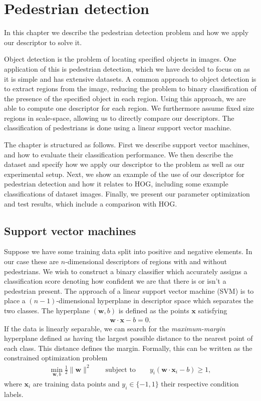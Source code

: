 \documentclass[thesis.tex]{subfiles}
\def\x{\mathbf{x}}
\def\w{\mathbf{w}}
\begin{document}
\chapter{Pedestrian detection}
\label{sec:od}
%
In this chapter we describe the pedestrian detection problem and how we apply our descriptor to solve it.

Object detection is the problem of locating specified objects in images. One application of this is pedestrian detection, which we have decided to focus on as it is simple and has extensive datasets. A common approach to object detection is to extract regions from the image, reducing the problem to binary classification of the presence of the specified object in each region. Using this approach, we are able to compute one descriptor for each region. We furthermore assume fixed size regions in scale-space, allowing us to directly compare our descriptors. The classification of pedestrians is done using a linear support vector machine.

The chapter is structured as follows. First we describe support vector machines, and how to evaluate their classification performance. We then describe the dataset and specify how we apply our descriptor to the problem as well as our experimental setup. Next, we show an example of the use of our descriptor for pedestrian detection and how it relates to HOG, including some example classifications of dataset images. Finally, we present our parameter optimization and test results, which include a comparison with HOG.
%
\section{Support vector machines}
%
Suppose we have some training data split into positive and negative elements. In our case these are $n$-dimensional descriptors of regions with and without pedestrians. We wish to construct a binary classifier which accurately assigns a classification score denoting how confident we are that there is or isn't a pedestrian present. The approach of a linear support vector machine (SVM) is to place a $(n-1)$-dimensional hyperplane in descriptor space which separates the two classes. The hyperplane $(\w,b)$ is defined as the points $\x$ satisfying
%
\begin{align*}
\w \cdot \x - b = 0.
\end{align*}
%
If the data is linearly separable, we can search for the \emph{maximum-margin} hyperplane defined as having the largest possible distance to the nearest point of each class. This distance defines the margin. Formally, this can be written as the constrained optimization problem
%
\begin{align*}
\min_{\w,b} \frac12 \| \w \|^2 \qquad \text{subject to} \qquad y_i (\w \cdot \x_i - b) \geq 1,
\end{align*}
%
where $\x_i$ are training data points and $y_i \in \{-1,1\}$ their respective condition labels.
\end{document}
